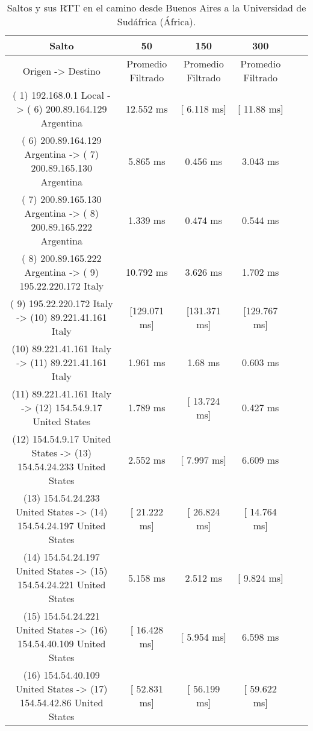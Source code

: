 \begin{table}[]
\centering
\caption{Saltos y sus RTT en el camino desde Buenos Aires a la Universidad de Sudáfrica (África).}
\begin{tabular}{ | c | c | c | c | c | c | }
	\hline 
Salto	& 50	& 150	& 300 \\ \hline
               Origen                ->               Destino              & 	Promedio Filtrado&	Promedio Filtrado&	Promedio Filtrado\\ \hline
( 1) 192.168.0.1     Local           -> ( 6) 200.89.164.129  Argentina     & 	    12.552 ms   	&  [  6.118 ms]  	 & [  11.88 ms]  \\ \hline
( 6) 200.89.164.129  Argentina       -> ( 7) 200.89.165.130  Argentina     & 	     5.865 ms   	&     0.456 ms   	 &    3.043 ms   \\ \hline
( 7) 200.89.165.130  Argentina       -> ( 8) 200.89.165.222  Argentina     & 	     1.339 ms   	&     0.474 ms   	 &    0.544 ms   \\ \hline
( 8) 200.89.165.222  Argentina       -> ( 9) 195.22.220.172  Italy         & 	    10.792 ms   	&     3.626 ms   	 &    1.702 ms   \\ \hline
( 9) 195.22.220.172  Italy           -> (10) 89.221.41.161   Italy         & 	  [129.071 ms]  	&  [131.371 ms]  	 & [129.767 ms]  \\ \hline
(10) 89.221.41.161   Italy           -> (11) 89.221.41.161   Italy         & 	     1.961 ms   	&      1.68 ms   	 &    0.603 ms   \\ \hline
(11) 89.221.41.161   Italy           -> (12) 154.54.9.17     United States & 	     1.789 ms   	&  [ 13.724 ms]  	 &    0.427 ms   \\ \hline
(12) 154.54.9.17     United States   -> (13) 154.54.24.233   United States & 	     2.552 ms   	&  [  7.997 ms]  	 &    6.609 ms   \\ \hline
(13) 154.54.24.233   United States   -> (14) 154.54.24.197   United States & 	  [ 21.222 ms]  	&  [ 26.824 ms]  	 & [ 14.764 ms]  \\ \hline
(14) 154.54.24.197   United States   -> (15) 154.54.24.221   United States & 	     5.158 ms   	&     2.512 ms   	 & [  9.824 ms]  \\ \hline
(15) 154.54.24.221   United States   -> (16) 154.54.40.109   United States & 	  [ 16.428 ms]  	&  [  5.954 ms]  	 &    6.598 ms   \\ \hline
(16) 154.54.40.109   United States   -> (17) 154.54.42.86    United States & 	  [ 52.831 ms]  	&  [ 56.199 ms]  	 & [ 59.622 ms]  \\ \hline

\end{tabular}
\end{table}
